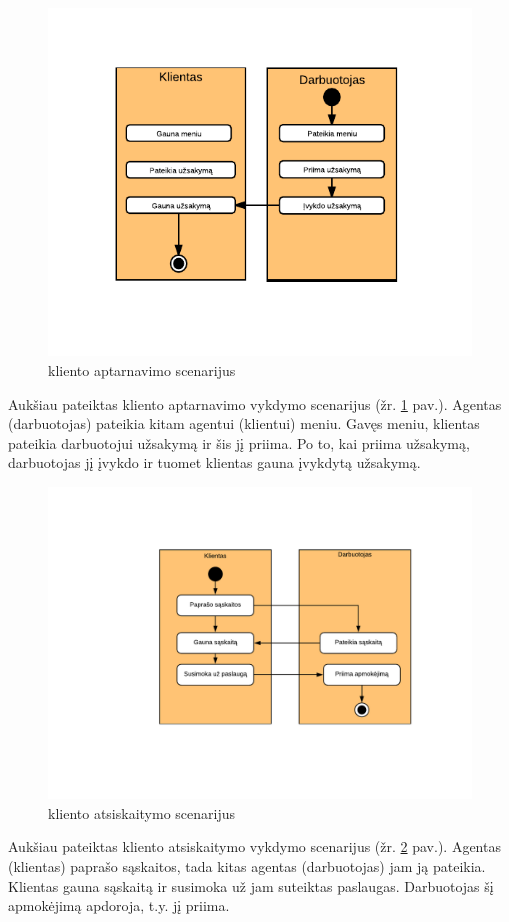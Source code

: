 \documentclass{VUMIFPSkursinis}
\begin{document}
	\begin {figure}[H]
	\centering
		
		\includegraphics[scale=1]{img/3lab/Diagrama4}
		\caption{kliento aptarnavimo scenarijus}
		\label{fig:diagrama4}
	\end{figure}
Aukšiau pateiktas kliento aptarnavimo vykdymo scenarijus (žr. \ref{fig:diagrama4} pav.). 
Agentas (darbuotojas) pateikia kitam agentui (klientui) meniu. Gavęs meniu, klientas pateikia 
darbuotojui užsakymą ir šis jį priima. Po to, kai priima užsakymą, darbuotojas jį įvykdo ir tuomet klientas gauna įvykdytą užsakymą. \\

	\begin {figure}[H]
	\centering
		
		\includegraphics[scale=1]{img/3lab/Diagrama5}
		\caption{kliento atsiskaitymo scenarijus}
		\label{fig:diagrama5}
	\end{figure}
Aukšiau pateiktas kliento atsiskaitymo vykdymo scenarijus (žr. \ref{fig:diagrama5} pav.).
Agentas (klientas) paprašo sąskaitos, tada kitas agentas (darbuotojas) jam ją pateikia. Klientas gauna sąskaitą ir susimoka už jam suteiktas paslaugas. Darbuotojas šį apmokėjimą apdoroja, t.y. jį priima.
\end{document}
